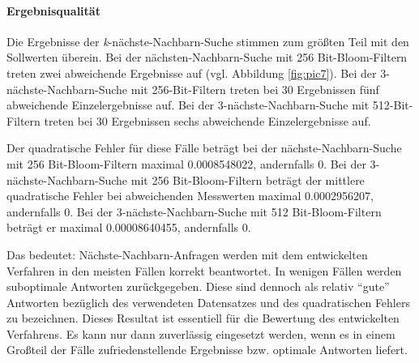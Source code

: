 \paragraph*{Ergebnisqualität}
Die Ergebnisse der \textit{k}-nächste-Nachbarn-Suche stimmen zum größten Teil mit den Sollwerten überein. Bei der nächsten-Nachbarn-Suche mit 256 Bit-Bloom-Filtern treten zwei abweichende Ergebnisse auf (vgl. Abbildung \ref{fig:pic7}). Bei der 3-nächste-Nachbarn-Suche mit 256-Bit-Filtern treten bei 30 Ergebnissen fünf abweichende Einzelergebnisse auf. Bei der 3-nächste-Nachbarn-Suche mit 512-Bit-Filtern treten bei 30 Ergebnissen sechs abweichende Einzelergebnisse auf. 

Der quadratische Fehler für diese Fälle beträgt bei der nächste-Nachbarn-Suche mit 256 Bit-Bloom-Filtern maximal 0.0008548022, andernfalls 0. Bei der 3-nächste-Nachbarn-Suche mit 256 Bit-Bloom-Filtern beträgt der mittlere quadratische Fehler bei abweichenden Messwerten maximal 0.0002956207, andernfalls 0. Bei der 3-nächste-Nachbarn-Suche mit 512 Bit-Bloom-Filtern beträgt er maximal 0.00008640455, andernfalls 0.

Das bedeutet: Nächste-Nachbarn-Anfragen werden mit dem entwickelten Verfahren in den meisten Fällen korrekt beantwortet. In wenigen Fällen werden suboptimale Antworten zurückgegeben. Diese sind dennoch als relativ "`gute"' Antworten bezüglich des verwendeten Datensatzes und des quadratischen Fehlers zu bezeichnen. Dieses Resultat ist essentiell für die Bewertung des entwickelten Verfahrens. Es kann nur dann zuverlässig eingesetzt werden, wenn es in einem Großteil der Fälle zufriedenstellende Ergebnisse bzw. optimale Antworten liefert. 
